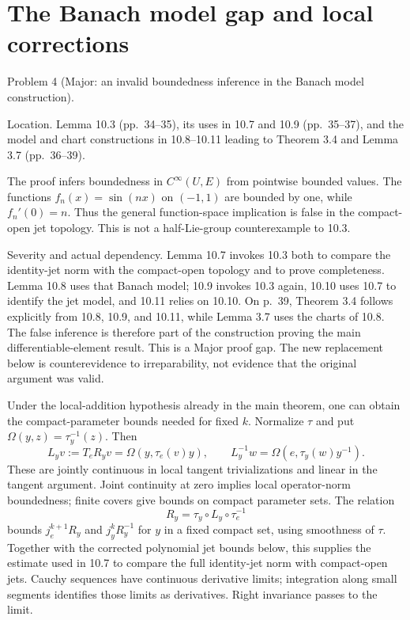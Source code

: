 \documentclass[10pt]{article}
\begin{document}
\section*{The Banach model gap and local corrections}
Problem 4 (Major: an invalid boundedness inference in the Banach model construction).\par
Location. Lemma 10.3 (pp. 34–35), its uses in 10.7 and 10.9 (pp. 35–37), and the model and chart constructions in 10.8–10.11 leading to Theorem 3.4 and Lemma 3.7 (pp. 36–39).\par
The proof infers boundedness in \(C^\infty(U,E)\) from pointwise bounded values. The functions \(f_n(x)=\sin(nx)\) on \((-1,1)\) are bounded by one, while \(f_n'(0)=n\). Thus the general function-space implication is false in the compact-open jet topology. This is not a half-Lie-group counterexample to 10.3.\par
Severity and actual dependency. Lemma 10.7 invokes 10.3 both to compare the identity-jet norm with the compact-open topology and to prove completeness. Lemma 10.8 uses that Banach model; 10.9 invokes 10.3 again, 10.10 uses 10.7 to identify the jet model, and 10.11 relies on 10.10. On p. 39, Theorem 3.4 follows explicitly from 10.8, 10.9, and 10.11, while Lemma 3.7 uses the charts of 10.8. The false inference is therefore part of the construction proving the main differentiable-element result. This is a Major proof gap. The new replacement below is counterevidence to irreparability, not evidence that the original argument was valid.\par
Under the local-addition hypothesis already in the main theorem, one can obtain the compact-parameter bounds needed for fixed \(k\). Normalize \(\tau\) and put \(\Omega(y,z)=\tau_y^{-1}(z)\). Then \[L_yv:=T_eR_yv=\Omega(y,\tau_e(v)y),\qquad
 L_y^{-1}w=\Omega(e,\tau_y(w)y^{-1}).\] These are jointly continuous in local tangent trivializations and linear in the tangent argument. Joint continuity at zero implies local operator-norm boundedness; finite covers give bounds on compact parameter sets. The relation \[R_y=\tau_y\circ L_y\circ\tau_e^{-1}\] bounds \(j_e^{k+1}R_y\) and \(j_y^kR_y^{-1}\) for \(y\) in a fixed compact set, using smoothness of \(\tau\). Together with the corrected polynomial jet bounds below, this supplies the estimate used in 10.7 to compare the full identity-jet norm with compact-open jets. Cauchy sequences have continuous derivative limits; integration along small segments identifies those limits as derivatives. Right invariance passes to the limit.\par
\end{document}
